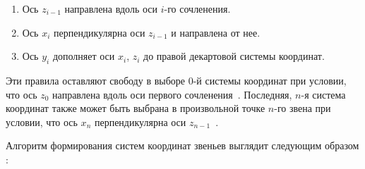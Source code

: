 \documentclass[oneside, final, 14pt]{extarticle}
\begin{document}
\begin{enumerate}
  \item Ось \(z_{i-1}\) направлена вдоль оси \(i\)-го сочленения.
  \item Ось \(x_i\) перпендикулярна оси \(z_{i-1}\) и направлена от нее.
  \item Ось \(y_i\) дополняет оси \(x_i\), \(z_i\) до правой декартовой системы координат.
\end{enumerate}
\par
Эти правила оставляют свободу в выборе \(0\)-й системы координат при условии, что ось \(z_0\) направлена вдоль оси первого сочленения~\cite{fu:rob_tech}.
Последняя, \(n\)-я система координат также может быть выбрана в произвольной точке \(n\)-го звена при условии, что ось \(x_n\) перпендикулярна оси \(z_{n-1}\)~\cite{fu:rob_tech}.
\par
Алгоритм формирования систем координат звеньев выглядит следующим образом \cite{borisov:mod_rob}: \label{p:al_pr_kor}
\end{document}
